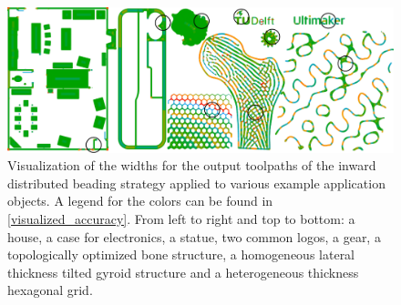 \begin{figure}
\centering
\includegraphics[width=\columnwidth]{sources/applications/combined_small_dilated_circled.pdf}
\caption{
Visualization of the widths for the output toolpaths of the inward distributed beading strategy applied to various example application objects.
A legend for the colors can be found in \cref{visualized_accuracy}.
From left to right and top to bottom: a house, a case for electronics, a statue, two common logos, a gear, a topologically optimized bone structure, a homogeneous lateral thickness tilted gyroid structure and a heterogeneous thickness hexagonal grid.
}
\label{applications_overview}
\end{figure}


